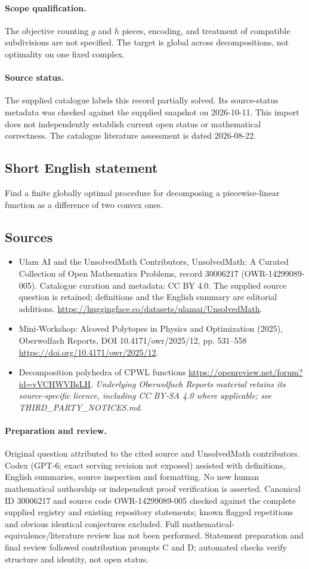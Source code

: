 \documentclass[11pt]{article}
\begin{document}
\paragraph{Scope qualification.}
The objective counting $g$ and $h$ pieces, encoding, and treatment of compatible subdivisions are not specified. The target is global across decompositions, not optimality on one fixed complex.
\paragraph{Source status.}
The supplied catalogue labels this record partially solved. Its source-status metadata was checked against the supplied snapshot on 2026-10-11. This import does not independently establish current open status or mathematical correctness. The catalogue literature assessment is dated 2026-08-22.
\subsection{Short English statement}
Find a finite globally optimal procedure for decomposing a piecewise-linear function as a difference of two convex ones.
\subsection{Sources}
\begin{itemize}
\item[S1] Ulam AI and the UnsolvedMath Contributors, UnsolvedMath: A Curated Collection of Open Mathematics Problems, record 30006217 (OWR-14299089-005). Catalogue curation and metadata: CC BY 4.0. The supplied source question is retained; definitions and the English summary are editorial additions.
\url{https://huggingface.co/datasets/ulamai/UnsolvedMath}.
\item[S2] Mini-Workshop: Alcoved Polytopes in Physics and Optimization (2025), Oberwolfach Reports, DOI 10.4171/owr/2025/12, pp. 531--558
\url{https://doi.org/10.4171/owr/2025/12}.
\item[S3] Decomposition polyhedra of CPWL functions
\url{https://openreview.net/forum?id=vVCHWVBsLH}.
\textit{Underlying Oberwolfach Reports material retains its source-specific licence, including CC BY-SA 4.0 where applicable; see THIRD\_PARTY\_NOTICES.md.}
\end{itemize}
\paragraph{Preparation and review.}
Original question attributed to the cited source and UnsolvedMath contributors. Codex (GPT-6; exact serving revision not exposed) assisted with definitions, English summaries, source inspection and formatting. No new human mathematical authorship or independent proof verification is asserted. Canonical ID 30006217 and source code OWR-14299089-005 checked against the complete supplied registry and existing repository statements; known flagged repetitions and obvious identical conjectures excluded. Full mathematical-equivalence/literature review has not been performed. Statement preparation and final review followed contribution prompts C and D; automated checks verify structure and identity, not open status.
\label{end:30006217}
\end{document}
